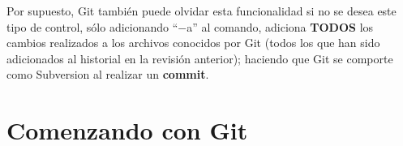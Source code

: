 \documentclass[12pt, spanish, oneside, onecolumn, a4paper]{report}
\begin{document}
Por supuesto, Git también puede olvidar esta funcionalidad si no se desea este tipo de control, sólo adicionando ``$-$a'' al comando, adiciona \textbf{TODOS} los cambios realizados a los archivos conocidos por Git (todos los que han sido adicionados al historial en la revisión anterior); haciendo que Git se comporte como Subversion al realizar un \textbf{commit}.


\chapter{Comenzando con Git}
\label{chap:gettingstarted}




\glsaddall
\printglossaries
\end{document}
